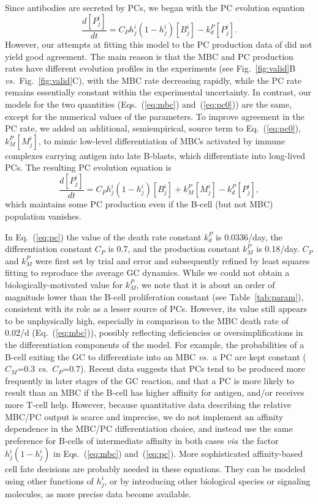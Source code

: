 \documentclass[utf8]{frontiersHLTH}%
\newcommand{\td}[2]{\frac{d {#1}}{d {#2}}}
\newcommand{\vo}[1]{#1} %
\def\vs {{\it vs.}}
\def\via {{\it via}}
\newcommand{\eq}[1] {Eq.~(\ref{eq:#1})}
\newcommand{\eqs}[2]{Eqs.~(\ref{eq:#1}) and~(\ref{eq:#2})}
\newcommand{\fig}[1]{Fig.~\ref{fig:#1}}
\newcommand{\tab}[1]{Table~\ref{tab:#1}}
\begin{document}
Since antibodies are secreted by PCs, we began with the PC evolution equation
\begin{equation}
 \td{[P^i_j]}{t} = C_{P} h^i_j(1-h^i_j)[B^i_j] - k^{P}_d [P^i_j].
 \label{eq:pc0}
\end{equation}
However, our attempts at fitting this model to the PC production data of
\citet{weisel16} did not yield good agreement. The main reason
is that the MBC and PC production rates have different evolution
profiles in the experiments (see \fig{valid}B \vs~\fig{valid}C), with the MBC rate
decreasing rapidly, while the PC rate remains essentially constant within the experimental uncertainty.
In contrast, our models for the two quantities (\eqs{mbc}{pc0}) are
the same, except for the numerical values of the parameters. 
\vo{To improve agreement in the PC rate,}
we added an additional, semiempirical, source term to \eq{pc0}, $k^{P}_{M} [M^i_j]$, to mimic low-level differentiation of MBCs
activated by immune complexes carrying antigen into late B-blasts, which differentiate into long-lived PCs.\cite{liu92,rundell98}
The resulting PC evolution equation is
\begin{equation}
 \td{[P^i_j]}{t} = C_{P} h^i_j(1-h^i_j)[B^i_j] + k^{P}_{M} [M^i_j] - k^{P}_d [P^i_j],
 \label{eq:pc}
\end{equation}
which maintains some PC production even if the B-cell (but not MBC) population
vanishes.

In \eq{pc} the value of the death rate constant $k^{P}_d$ is
0.0336/day\cite{rundell98}, the differentiation constant $C_P$ is 0.7,
and the production constant $k^{P}_{M}$ is 0.18/day. $C_P$ and $k^{P}_{M}$
were first set by trial and error and subsequently refined by least squares
fitting to reproduce the average GC dynamics. While we could not obtain a
biologically-motivated value for $k^{P}_{M}$, we note that it is about an order of
magnitude lower than the B-cell proliferation constant (see \tab{param}), consistent with its
role as a lesser source of PCs. However, its value still appears to be unphysically high,
especially in comparison to the MBC death rate of 0.02/d (\eq{mbc}), possibly reflecting
deficiencies or oversimplifications in the differentiation components of the model.
For example, the probabilities of a B-cell exiting the GC to
differentiate into an MBC \vs~a PC are kept constant ($C_M$=0.3 \vs~$C_P$=0.7). Recent
data suggests that PCs tend to be produced more frequently in later
stages of the GC reaction,\cite{weisel16} and that a PC is more likely
to result than an MBC if the B-cell has higher affinity for antigen, and/or
receives more T-cell help.\cite{ise19}
However,
because quantitative data describing the relative MBC/PC output is scarce
and imprecise, we do not implement an affinity dependence in the MBC/PC
differentiation choice, and instead use the same preference for B-cells of
intermediate affinity in both cases \via~the factor $h^i_j(1-h^i_j)$ in
\eqs{mbc}{pc}. More sophisticated affinity-based cell fate decisions are
probably needed in these equations.  They can be \vo{modeled} using other functions of
$h^i_j$, or by introducing other biological species or signaling molecules,
as more precise data become available.
\end{document}
